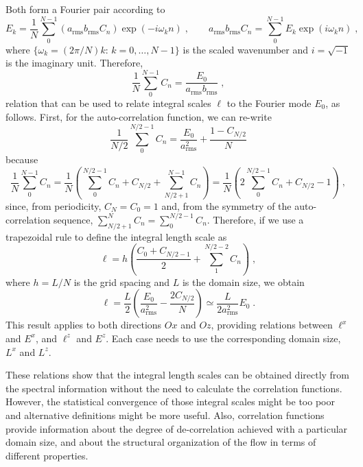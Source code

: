 Both form a Fourier pair according to
\begin{equation*}
E_k=\frac{1}{N}\sum_0^{N-1}(a_\mathrm{rms}b_\mathrm{rms}C_n)\exp(-i\omega_kn)\;,\qquad
a_\mathrm{rms}b_\mathrm{rms}C_n=\sum_0^{N-1}E_k\exp(i\omega_kn)\;,
\end{equation*}
where $\{\omega_k=(2\pi/N)k:\, k = 0,\ldots,N-1\}$ is the scaled wavenumber and
$i=\sqrt{-1}$ is the imaginary unit. Therefore,
\begin{equation}
\frac{1}{N}\sum_0^{N-1}C_n=\frac{E_0}{a_\mathrm{rms}b_\mathrm{rms}} \;,
\end{equation}
relation that can be used to relate integral scales $\ell$ to the Fourier mode
$E_0$, as follows. First, for the auto-correlation function, we can re-write
\begin{equation}
\frac{1}{N/2}\sum_0^{N/2-1}C_n=\frac{E_0}{a_\mathrm{rms}^2}+\frac{1-C_{N/2}}{N} 
\end{equation}
because
\begin{equation*}
\frac{1}{N}\sum_0^{N-1}C_n = \frac{1}{N}\left(\sum_0^{N/2-1}C_n
+C_{N/2}+\sum_{N/2+1}^{N-1}C_n\right) = \frac{1}{N}\left(2\sum_0^{N/2-1}C_n
+C_{N/2}-1\right) \;,
\end{equation*}
since, from periodicity, $C_N=C_0=1$ and, from the symmetry of the
auto-correlation sequence, $\sum_{N/2+1}^{N}C_n=\sum_0^{N/2-1}C_n$. Therefore,
if we use a trapezoidal rule to define the integral length scale as
\begin{equation}
\ell=h\left(\frac{C_0+C_{N/2-1}}{2}+\sum_1^{N/2-2}C_n\right)\;,
\end{equation}
where $h=L/N$ is the grid spacing and $L$ is the domain size, we obtain
\begin{equation}
\ell=\frac{L}{2}\left(\frac{E_0}{a_\mathrm{rms}^2}-\frac{2C_{N/2}}{N}\right)
\simeq \frac{L}{2a_\mathrm{rms}^2}E_0\;.
\end{equation}
This result applies to both directions $Ox$ and $Oz$, providing relations
between $\ell^x$ and $E^x$, and $\ell^z$ and $E^z$. Each case needs to use the
corresponding domain size, $L^x$ and $L^z$.

These relations show that the integral length scales can be obtained directly
from the spectral information without the need to calculate the correlation
functions. However, the statistical convergence of those integral scales might
be too poor and alternative definitions might be more useful. Also, correlation
functions provide information about the degree of de-correlation achieved with a
particular domain size, and about the structural organization of the flow in
terms of different properties.

